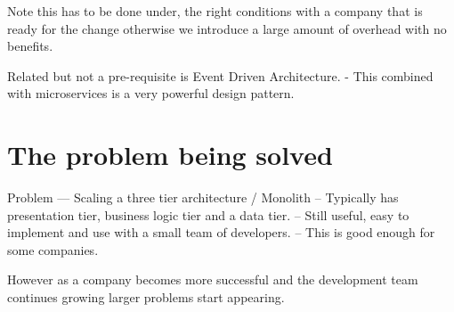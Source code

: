 \documentclass[a4paper, 11pt]{book}
\begin{document}
    Note this has to be done under, the right conditions with a company that is ready for the change otherwise we introduce a large amount of overhead with no benefits.

    Related but not a pre-requisite is Event Driven Architecture.
    - This combined with microservices is a very powerful design pattern.

    \section{The problem being solved}
    Problem --- Scaling a three tier architecture / Monolith
    -- Typically has presentation tier, business logic tier and a data tier.
    -- Still useful, easy to implement and use with a small team of developers.
    -- This is good enough for some companies.

    However as a company becomes more successful and the development team continues growing larger problems start appearing.
\end{document}
